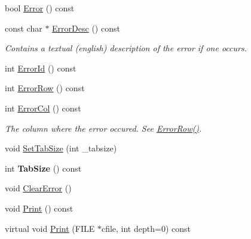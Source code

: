 \begin{DoxyCompactItemize}
\item 
bool \hyperlink{class_ti_xml_document_a6dfc01a6e5d58e56acd537dfd3bdeb29}{Error} () const 
\item 
\hypertarget{class_ti_xml_document_a9d0f689f6e09ea494ea547be8d79c25e}{
const char $\ast$ \hyperlink{class_ti_xml_document_a9d0f689f6e09ea494ea547be8d79c25e}{ErrorDesc} () const }
\label{class_ti_xml_document_a9d0f689f6e09ea494ea547be8d79c25e}

\begin{DoxyCompactList}\small\item\em Contains a textual (english) description of the error if one occurs. \item\end{DoxyCompactList}\item 
int \hyperlink{class_ti_xml_document_af96fc2f3f9ec6422782bfe916c9e778f}{ErrorId} () const 
\item 
int \hyperlink{class_ti_xml_document_af30efc75e804aa2e92fb8be3a8cb676e}{ErrorRow} () const 
\item 
\hypertarget{class_ti_xml_document_aa90bc630ee5203c6109ca5fad3323649}{
int \hyperlink{class_ti_xml_document_aa90bc630ee5203c6109ca5fad3323649}{ErrorCol} () const }
\label{class_ti_xml_document_aa90bc630ee5203c6109ca5fad3323649}

\begin{DoxyCompactList}\small\item\em The column where the error occured. See \hyperlink{class_ti_xml_document_af30efc75e804aa2e92fb8be3a8cb676e}{ErrorRow()}. \item\end{DoxyCompactList}\item 
void \hyperlink{class_ti_xml_document_a51dac56316f89b35bdb7d0d433ba988e}{SetTabSize} (int \_\-tabsize)
\item 
\hypertarget{class_ti_xml_document_a612360241b85bad0826b2a9ae9cda561}{
int {\bfseries TabSize} () const }
\label{class_ti_xml_document_a612360241b85bad0826b2a9ae9cda561}

\item 
void \hyperlink{class_ti_xml_document_ac66b8c28db86363315712a3574e87c35}{ClearError} ()
\item 
void \hyperlink{class_ti_xml_document_af08389ec70ee9b2de7f800e206a18510}{Print} () const 
\item 
\hypertarget{class_ti_xml_document_a7b1aea204fee266b70b9c105c8bf2ada}{
virtual void \hyperlink{class_ti_xml_document_a7b1aea204fee266b70b9c105c8bf2ada}{Print} (FILE $\ast$cfile, int depth=0) const }
\label{class_ti_xml_document_a7b1aea204fee266b70b9c105c8bf2ada}


\end{DoxyCompactItemize}

